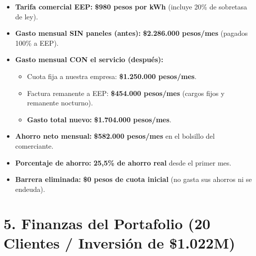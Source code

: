 \documentclass[11pt,letterpaper]{article}
\begin{document}
\begin{itemize}[leftmargin=1.5em, itemsep=4pt]
    \item \textbf{Tarifa comercial EEP:} \textbf{\$980 pesos por kWh} (incluye 20\% de sobretasa de ley).
    \item \textbf{Gasto mensual SIN paneles (antes):} \textbf{\$2.286.000 pesos/mes} (pagados 100\% a EEP).
    \item \textbf{Gasto mensual CON el servicio (después):}
    \begin{itemize}[leftmargin=1.3em, itemsep=2pt]
        \item Cuota fija a nuestra empresa: \textbf{\$1.250.000 pesos/mes}.
        \item Factura remanente a EEP: \textbf{\$454.000 pesos/mes} (cargos fijos y remanente nocturno).
        \item \textbf{Gasto total nuevo:} \textbf{\$1.704.000 pesos/mes}.
    \end{itemize}
    \item \textbf{Ahorro neto mensual:} \textbf{\$582.000 pesos/mes} en el bolsillo del comerciante.
    \item \textbf{Porcentaje de ahorro:} \textbf{25,5\% de ahorro real} desde el primer mes.
    \item \textbf{Barrera eliminada:} \textbf{\$0 pesos de cuota inicial} (no gasta sus ahorros ni se endeuda).
\end{itemize}

\section*{5. Finanzas del Portafolio (20 Clientes / Inversión de \$1.022M)}
\end{document}
